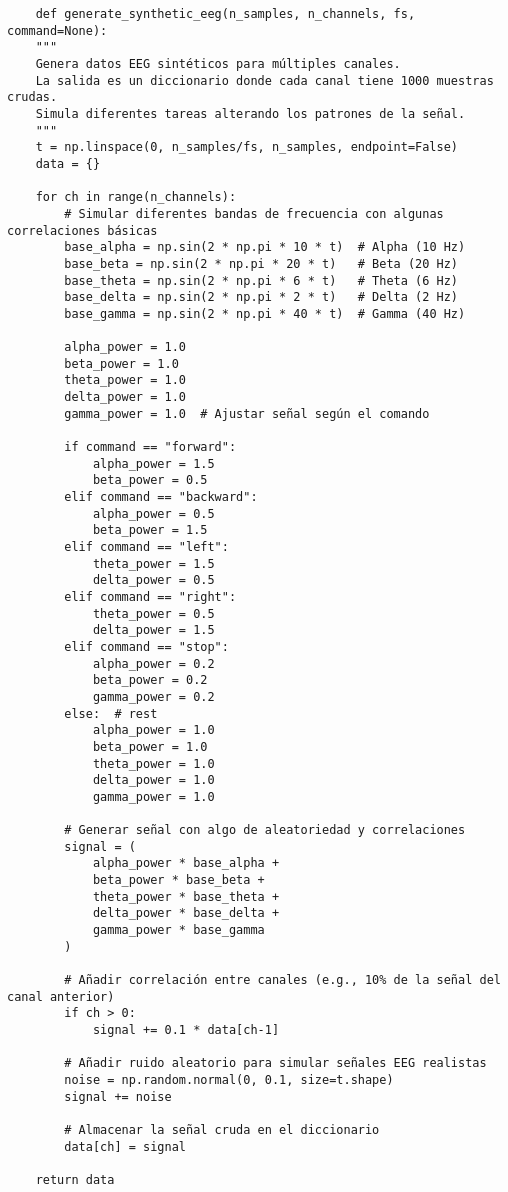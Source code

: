 \documentclass{article}
\begin{document}
\begin{lstlisting}
    def generate_synthetic_eeg(n_samples, n_channels, fs, command=None):
    """
    Genera datos EEG sintéticos para múltiples canales.
    La salida es un diccionario donde cada canal tiene 1000 muestras crudas.
    Simula diferentes tareas alterando los patrones de la señal.
    """
    t = np.linspace(0, n_samples/fs, n_samples, endpoint=False)
    data = {}

    for ch in range(n_channels):
        # Simular diferentes bandas de frecuencia con algunas correlaciones básicas
        base_alpha = np.sin(2 * np.pi * 10 * t)  # Alpha (10 Hz)
        base_beta = np.sin(2 * np.pi * 20 * t)   # Beta (20 Hz)
        base_theta = np.sin(2 * np.pi * 6 * t)   # Theta (6 Hz)
        base_delta = np.sin(2 * np.pi * 2 * t)   # Delta (2 Hz)
        base_gamma = np.sin(2 * np.pi * 40 * t)  # Gamma (40 Hz)

        alpha_power = 1.0
        beta_power = 1.0
        theta_power = 1.0
        delta_power = 1.0
        gamma_power = 1.0  # Ajustar señal según el comando

        if command == "forward":
            alpha_power = 1.5
            beta_power = 0.5
        elif command == "backward":
            alpha_power = 0.5
            beta_power = 1.5
        elif command == "left":
            theta_power = 1.5
            delta_power = 0.5
        elif command == "right":
            theta_power = 0.5
            delta_power = 1.5
        elif command == "stop":
            alpha_power = 0.2
            beta_power = 0.2
            gamma_power = 0.2
        else:  # rest
            alpha_power = 1.0
            beta_power = 1.0
            theta_power = 1.0
            delta_power = 1.0
            gamma_power = 1.0        

        # Generar señal con algo de aleatoriedad y correlaciones
        signal = (
            alpha_power * base_alpha +
            beta_power * base_beta +
            theta_power * base_theta +
            delta_power * base_delta +
            gamma_power * base_gamma
        )

        # Añadir correlación entre canales (e.g., 10% de la señal del canal anterior)
        if ch > 0:
            signal += 0.1 * data[ch-1]

        # Añadir ruido aleatorio para simular señales EEG realistas
        noise = np.random.normal(0, 0.1, size=t.shape)
        signal += noise

        # Almacenar la señal cruda en el diccionario
        data[ch] = signal

    return data
\end{lstlisting}
\end{document}
